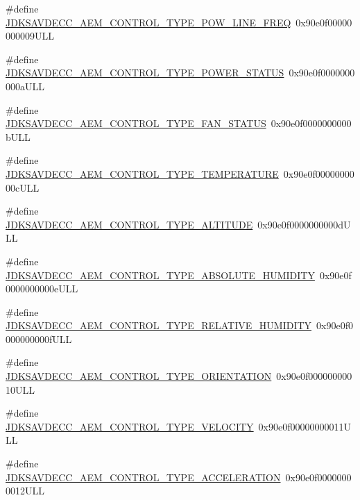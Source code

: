 \begin{DoxyCompactItemize}
\item 
\#define \hyperlink{group__control__type_ga459db96415bd83fd54546b399b5934d5}{J\+D\+K\+S\+A\+V\+D\+E\+C\+C\+\_\+\+A\+E\+M\+\_\+\+C\+O\+N\+T\+R\+O\+L\+\_\+\+T\+Y\+P\+E\+\_\+\+P\+O\+W\+\_\+\+L\+I\+N\+E\+\_\+\+F\+R\+EQ}~0x90e0f00000000009\+U\+LL
\item 
\#define \hyperlink{group__control__type_ga534d3564d1ca4bb511983a8918948438}{J\+D\+K\+S\+A\+V\+D\+E\+C\+C\+\_\+\+A\+E\+M\+\_\+\+C\+O\+N\+T\+R\+O\+L\+\_\+\+T\+Y\+P\+E\+\_\+\+P\+O\+W\+E\+R\+\_\+\+S\+T\+A\+T\+US}~0x90e0f0000000000a\+U\+LL
\item 
\#define \hyperlink{group__control__type_gad12d04b1528275c6ea8ececa112d80d2}{J\+D\+K\+S\+A\+V\+D\+E\+C\+C\+\_\+\+A\+E\+M\+\_\+\+C\+O\+N\+T\+R\+O\+L\+\_\+\+T\+Y\+P\+E\+\_\+\+F\+A\+N\+\_\+\+S\+T\+A\+T\+US}~0x90e0f0000000000b\+U\+LL
\item 
\#define \hyperlink{group__control__type_ga11b59f72eceb86bf5aca4d0345ca578d}{J\+D\+K\+S\+A\+V\+D\+E\+C\+C\+\_\+\+A\+E\+M\+\_\+\+C\+O\+N\+T\+R\+O\+L\+\_\+\+T\+Y\+P\+E\+\_\+\+T\+E\+M\+P\+E\+R\+A\+T\+U\+RE}~0x90e0f0000000000c\+U\+LL
\item 
\#define \hyperlink{group__control__type_ga2b03a3c09bfee0fa512c2ab793896e6a}{J\+D\+K\+S\+A\+V\+D\+E\+C\+C\+\_\+\+A\+E\+M\+\_\+\+C\+O\+N\+T\+R\+O\+L\+\_\+\+T\+Y\+P\+E\+\_\+\+A\+L\+T\+I\+T\+U\+DE}~0x90e0f0000000000d\+U\+LL
\item 
\#define \hyperlink{group__control__type_gaee665f90cfe14929adc1c3e47d92a5b8}{J\+D\+K\+S\+A\+V\+D\+E\+C\+C\+\_\+\+A\+E\+M\+\_\+\+C\+O\+N\+T\+R\+O\+L\+\_\+\+T\+Y\+P\+E\+\_\+\+A\+B\+S\+O\+L\+U\+T\+E\+\_\+\+H\+U\+M\+I\+D\+I\+TY}~0x90e0f0000000000e\+U\+LL
\item 
\#define \hyperlink{group__control__type_gafa356a7e8abf5d9e2799e863511d581b}{J\+D\+K\+S\+A\+V\+D\+E\+C\+C\+\_\+\+A\+E\+M\+\_\+\+C\+O\+N\+T\+R\+O\+L\+\_\+\+T\+Y\+P\+E\+\_\+\+R\+E\+L\+A\+T\+I\+V\+E\+\_\+\+H\+U\+M\+I\+D\+I\+TY}~0x90e0f0000000000f\+U\+LL
\item 
\#define \hyperlink{group__control__type_ga64866f6d3cea1c3d5887c2f86c305a43}{J\+D\+K\+S\+A\+V\+D\+E\+C\+C\+\_\+\+A\+E\+M\+\_\+\+C\+O\+N\+T\+R\+O\+L\+\_\+\+T\+Y\+P\+E\+\_\+\+O\+R\+I\+E\+N\+T\+A\+T\+I\+ON}~0x90e0f00000000010\+U\+LL
\item 
\#define \hyperlink{group__control__type_gaba49323cbc619b9a9979f53111a55a65}{J\+D\+K\+S\+A\+V\+D\+E\+C\+C\+\_\+\+A\+E\+M\+\_\+\+C\+O\+N\+T\+R\+O\+L\+\_\+\+T\+Y\+P\+E\+\_\+\+V\+E\+L\+O\+C\+I\+TY}~0x90e0f00000000011\+U\+LL
\item 
\#define \hyperlink{group__control__type_ga30d7e93956fb7134107c9897953413ad}{J\+D\+K\+S\+A\+V\+D\+E\+C\+C\+\_\+\+A\+E\+M\+\_\+\+C\+O\+N\+T\+R\+O\+L\+\_\+\+T\+Y\+P\+E\+\_\+\+A\+C\+C\+E\+L\+E\+R\+A\+T\+I\+ON}~0x90e0f00000000012\+U\+LL

\end{DoxyCompactItemize}
